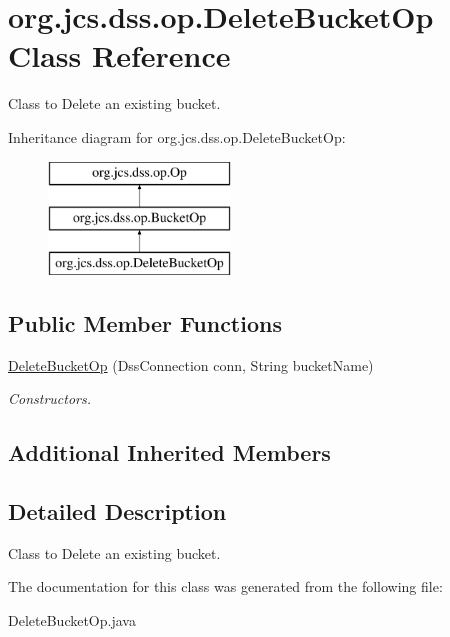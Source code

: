 \hypertarget{classorg_1_1jcs_1_1dss_1_1op_1_1DeleteBucketOp}{}\section{org.\+jcs.\+dss.\+op.\+Delete\+Bucket\+Op Class Reference}
\label{classorg_1_1jcs_1_1dss_1_1op_1_1DeleteBucketOp}


Class to Delete an existing bucket.  


Inheritance diagram for org.\+jcs.\+dss.\+op.\+Delete\+Bucket\+Op\+:\begin{figure}[H]
\begin{center}
\leavevmode
\includegraphics[height=3.000000cm]{classorg_1_1jcs_1_1dss_1_1op_1_1DeleteBucketOp}
\end{center}
\end{figure}
\subsection*{Public Member Functions}
\begin{DoxyCompactItemize}
\item 
\hyperlink{classorg_1_1jcs_1_1dss_1_1op_1_1DeleteBucketOp_a9e2669a82a1d8598968bedfc1e8e79f0}{Delete\+Bucket\+Op} (Dss\+Connection conn, String bucket\+Name)\hypertarget{classorg_1_1jcs_1_1dss_1_1op_1_1DeleteBucketOp_a9e2669a82a1d8598968bedfc1e8e79f0}{}\label{classorg_1_1jcs_1_1dss_1_1op_1_1DeleteBucketOp_a9e2669a82a1d8598968bedfc1e8e79f0}

\begin{DoxyCompactList}\small\item\em Constructors. \end{DoxyCompactList}\end{DoxyCompactItemize}
\subsection*{Additional Inherited Members}


\subsection{Detailed Description}
Class to Delete an existing bucket. 

The documentation for this class was generated from the following file\+:\begin{DoxyCompactItemize}
\item 
Delete\+Bucket\+Op.\+java\end{DoxyCompactItemize}
